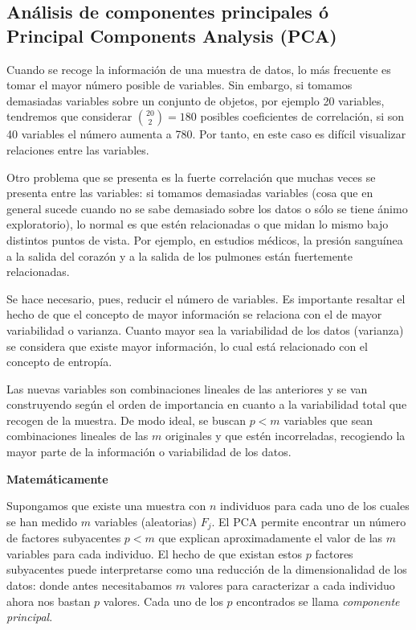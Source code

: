 \documentclass[]{article}
\numberwithin{equation}{section}
\begin{document}
\subsection{Análisis de componentes principales ó Principal Components
Analysis
(PCA)}\label{analisis-de-componentes-principales-o-principal-components-analysis-pca}

Cuando se recoge la información de una muestra de datos, lo más
frecuente es tomar el mayor número posible de variables. Sin embargo, si
tomamos demasiadas variables sobre un conjunto de objetos, por ejemplo
20 variables, tendremos que considerar \(\binom{20}{2}=180\) posibles
coeficientes de correlación, si son 40 variables el número aumenta a
780. Por tanto, en este caso es difícil visualizar relaciones entre las
variables.

Otro problema que se presenta es la fuerte correlación que muchas veces
se presenta entre las variables: si tomamos demasiadas variables (cosa
que en general sucede cuando no se sabe demasiado sobre los datos o sólo
se tiene ánimo exploratorio), lo normal es que estén relacionadas o que
midan lo mismo bajo distintos puntos de vista. Por ejemplo, en estudios
médicos, la presión sanguínea a la salida del corazón y a la salida de
los pulmones están fuertemente relacionadas.

Se hace necesario, pues, reducir el número de variables. Es importante
resaltar el hecho de que el concepto de mayor información se relaciona
con el de mayor variabilidad o varianza. Cuanto mayor sea la
variabilidad de los datos (varianza) se considera que existe mayor
información, lo cual está relacionado con el concepto de entropía.

Las nuevas variables son combinaciones lineales de las anteriores y se
van construyendo según el orden de importancia en cuanto a la
variabilidad total que recogen de la muestra. De modo ideal, se buscan
\(p<m\) variables que sean combinaciones lineales de las \(m\)
originales y que estén incorreladas, recogiendo la mayor parte de la
información o variabilidad de los datos.

\textbf{Matemáticamente}

Supongamos que existe una muestra con \(n\) individuos para cada uno de
los cuales se han medido \(m\) variables (aleatorias) \(F_j\). El PCA
permite encontrar un número de factores subyacentes \(p < m\) que
explican aproximadamente el valor de las \(m\) variables para cada
individuo. El hecho de que existan estos \(p\) factores subyacentes
puede interpretarse como una reducción de la dimensionalidad de los
datos: donde antes necesitabamos \(m\) valores para caracterizar a cada
individuo ahora nos bastan \(p\) valores. Cada uno de los \(p\)
encontrados se llama \emph{componente principal}.
\end{document}

